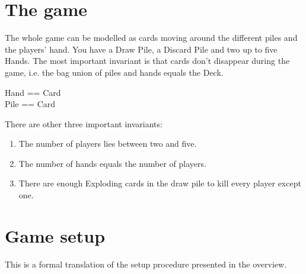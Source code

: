 \documentclass[11pt, fuzz]{article}
\begin{document}
\section{The game}

The whole game can be modelled as cards moving around the different piles and the players' hand. You have a Draw Pile, a Discard Pile and two up to five Hands. The most important invariant is that cards don't disappear during the game, i.e. the bag union of piles and hands equals the Deck. 

\begin{zed}
Hand == \bag Card \\
Pile == \seq Card \\
\end{zed}


There are other three important invariants:

\begin{enumerate}
    \item The number of players lies between two and five. 
    \item The number of hands equals the number of players. 
    \item There are enough Exploding cards in the draw pile to kill every player except one. 
\end{enumerate}

\section{Game setup}

This is a formal translation of the setup procedure presented in the overview. 
\end{document}

